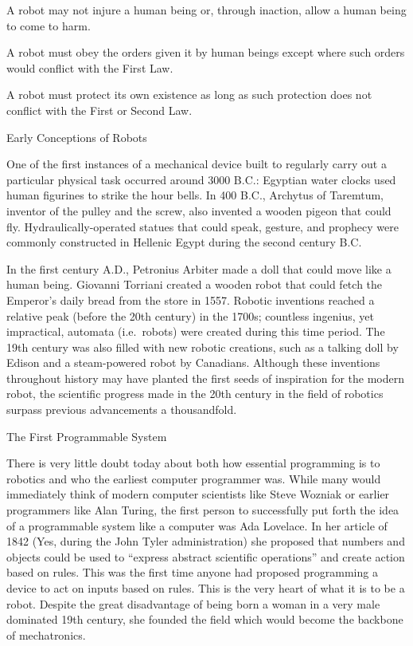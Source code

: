 \documentclass[
]{book}
\begin{document}
A robot may not injure a human being or, through inaction, allow a human being to come to harm.

A robot must obey the orders given it by human beings except where such orders would conflict with the First Law.

A robot must protect its own existence as long as such protection does not conflict with the First or Second Law.

Early Conceptions of Robots

One of the first instances of a mechanical device built to regularly carry out a particular physical task occurred around 3000 B.C.: Egyptian water clocks used human figurines to strike the hour bells. In 400 B.C., Archytus of Taremtum, inventor of the pulley and the screw, also invented a wooden pigeon that could fly. Hydraulically-operated statues that could speak, gesture, and prophecy were commonly constructed in Hellenic Egypt during the second century B.C.

In the first century A.D., Petronius Arbiter made a doll that could move like a human being. Giovanni Torriani created a wooden robot that could fetch the Emperor's daily bread from the store in 1557. Robotic inventions reached a relative peak (before the 20th century) in the 1700s; countless ingenius, yet impractical, automata (i.e.~robots) were created during this time period. The 19th century was also filled with new robotic creations, such as a talking doll by Edison and a steam-powered robot by Canadians. Although these inventions throughout history may have planted the first seeds of inspiration for the modern robot, the scientific progress made in the 20th century in the field of robotics surpass previous advancements a thousandfold.

The First Programmable System

There is very little doubt today about both how essential programming is to robotics and who the earliest computer programmer was. While many would immediately think of modern computer scientists like Steve Wozniak or earlier programmers like Alan Turing, the first person to successfully put forth the idea of a programmable system like a computer was Ada Lovelace. In her article of 1842 (Yes, during the John Tyler administration) she proposed that numbers and objects could be used to ``express abstract scientific operations'' and create action based on rules. This was the first time anyone had proposed programming a device to act on inputs based on rules. This is the very heart of what it is to be a robot. Despite the great disadvantage of being born a woman in a very male dominated 19th century, she founded the field which would become the backbone of mechatronics.
\end{document}
